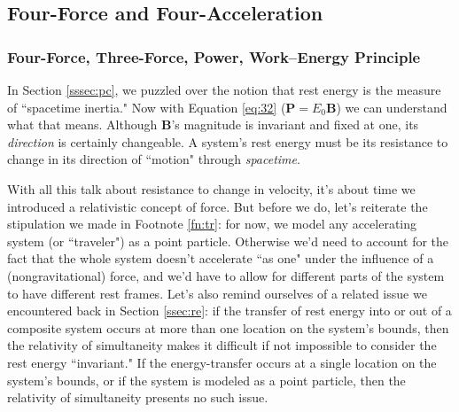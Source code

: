 \documentclass[12pt]{article}
\renewcommand{\vv}[1]{\mathbf{#1}}
\begin{document}
\subsection{Four-Force and Four-Acceleration}

\subsubsection{Four-Force, Three-Force, Power, Work--Energy Principle}\label{sssec:ff}

In Section \ref{sssec:pc}, we puzzled over the notion that rest energy is the measure of ``spacetime inertia." Now with Equation \ref{eq:32} ($\vv P = E_0 \vv B$) we can understand what that means. Although $\vv B$'s magnitude is invariant and fixed at one, its \emph{direction} is certainly changeable. A system's rest energy must be its resistance to change in its direction of ``motion" through \emph{spacetime}.

With all this talk about resistance to change in velocity, it's about time we introduced a relativistic concept of force. But before we do, let's reiterate the stipulation we made in Footnote \ref{fn:tr}: for now, we model any accelerating system (or ``traveler") as a point particle. Otherwise we'd need to account for the fact that the whole system doesn't accelerate ``as one" under the influence of a (nongravitational) force, and we'd have to allow for different parts of the system to have different rest frames. Let's also remind ourselves of a related issue we encountered back in Section \ref{ssec:re}: if the transfer of rest energy into or out of a composite system occurs at more than one location on the system's bounds, then the relativity of simultaneity makes it difficult if not impossible to consider the rest energy ``invariant." If the energy-transfer occurs at a single location on the system's bounds, or if the system is modeled as a point particle, then the relativity of simultaneity presents no such issue.
\end{document}
